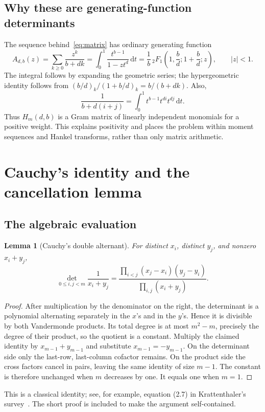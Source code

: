 \documentclass[11pt,a4paper]{article}
\newtheorem{lemma}[theorem]{Lemma}
\theoremstyle{definition}
\theoremstyle{remark}
\newcommand{\dd}{\mathrm d}
\begin{document}
\subsection{Why these are generating-function determinants}
The sequence behind~\eqref{eq:matrix} has ordinary generating function
\begin{equation}
 A_{d,b}(z)=\sum_{k\ge0}\frac{z^k}{b+dk}
 =\int_0^1\frac{t^{b-1}}{1-zt^d}\,\dd t
 =\frac1b\,{}_2F_1\left(1,\frac bd;1+\frac bd;z\right),
 \qquad |z|<1.
 \label{eq:gf-moment}
\end{equation}
The integral follows by expanding the geometric series; the hypergeometric
identity follows from
$(b/d)_k/(1+b/d)_k=b/(b+dk)$. Also,
\[
 \frac1{b+d(i+j)}=\int_0^1 t^{b-1}t^{di}t^{dj}\,\dd t.
\]
Thus $H_m(d,b)$ is a Gram matrix of linearly independent monomials for a
positive weight. This explains positivity and places the problem within
moment sequences and Hankel transforms, rather than only matrix arithmetic.

\section{Cauchy's identity and the cancellation lemma}
\label{sec:proof}

\subsection{The algebraic evaluation}
\begin{lemma}[Cauchy's double alternant]
\label{lem:cauchy}
For distinct $x_i$, distinct $y_j$, and nonzero $x_i+y_j$,
\begin{equation}
 \det_{0\le i,j<m}\frac1{x_i+y_j}
 =\frac{\displaystyle\prod_{i<j}(x_j-x_i)(y_j-y_i)}
        {\displaystyle\prod_{i,j}(x_i+y_j)}.
 \label{eq:cauchy}
\end{equation}
\end{lemma}
\begin{proof}
After multiplication by the denominator on the right, the determinant is a
polynomial alternating separately in the $x$'s and in the $y$'s. Hence it
is divisible by both Vandermonde products. Its total degree is at most
$m^2-m$, precisely the degree of their product, so the quotient is a
constant. Multiply the claimed identity by $x_{m-1}+y_{m-1}$ and substitute
$x_{m-1}=-y_{m-1}$. On the determinant side only the last-row, last-column
cofactor remains. On the product side the cross factors cancel in pairs,
leaving the same identity of size $m-1$. The constant is therefore unchanged
when $m$ decreases by one. It equals one when $m=1$.
\end{proof}
This is a classical identity; see, for example, equation (2.7) in
Krattenthaler's survey~\cite{krattenthaler}. The short proof is included to
make the argument self-contained.
\end{document}
